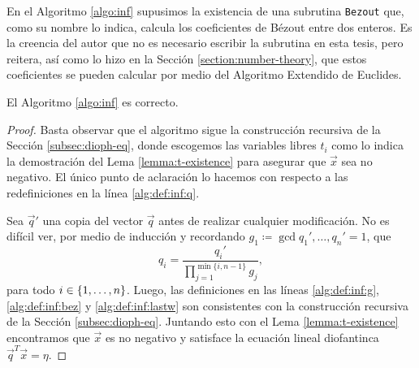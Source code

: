 En el Algoritmo \ref{algo:inf} supusimos la existencia de una subrutina \texttt{Bezout} que, como su
nombre lo indica, calcula los coeficientes de Bézout entre dos enteros. Es la creencia del autor
que no es necesario escribir la subrutina en esta tesis, pero reitera, así como lo hizo en la Sección
\ref{section:number-theory}, que estos coeficientes se pueden calcular por medio del Algoritmo
Extendido de Euclides.

\begin{lemma}
	\label{lemma:alg:inf:correct}
	El Algoritmo \ref{algo:inf} es correcto.
\end{lemma}
\begin{proof}
	Basta observar que el algoritmo sigue la construcción recursiva de la Sección
	\ref{subsec:dioph-eq}, donde escogemos las variables libres $t_i$ como lo indica la demostración
	del Lema \ref{lemma:t-existence} para asegurar que $\vec{x}$ sea no negativo. El único punto de
	aclaración lo hacemos con respecto a las redefiniciones en la línea \ref{alg:def:inf:q}.

	Sea $\vec{q}'$ una copia del vector $\vec{q}$ antes de realizar cualquier modificación. No es
	difícil ver, por medio de inducción y recordando $g_1 \coloneq \gcd{q_1', \ldots, q_n'} = 1$,
	que
	\begin{equation*}
		q_i = \frac{q_i'}{\prod_{j=1}^{\min\lbrace i, n - 1\rbrace}g_j},
	\end{equation*}
	para todo $i \in \lbrace 1, \ldots, n \rbrace$. Luego, las definiciones en las líneas
	\eqref{alg:def:inf:g}, \eqref{alg:def:inf:bez} y \eqref{alg:def:inf:lastw} son consistentes con
	la construcción recursiva de la Sección \ref{subsec:dioph-eq}. Juntando esto con el Lema
	\ref{lemma:t-existence} encontramos que $\vec{x}$ es no negativo y satisface la ecuación lineal
	diofantinca $\vec{q}^T\vec{x} = \eta$.




\end{proof}
